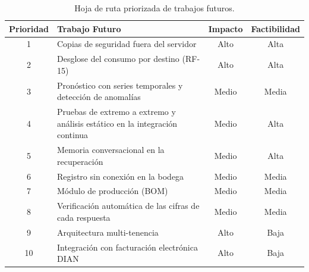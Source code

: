 \begin{table}[!htbp]
\centering
\caption{Hoja de ruta priorizada de trabajos futuros.}
\label{tab:roadmap}
\begin{tabular}{|c|>{\raggedright\arraybackslash}p{6cm}|c|c|}
\hline
\textbf{Prioridad} & \textbf{Trabajo Futuro} & \textbf{Impacto} & \textbf{Factibilidad} \\
\hline
1 & Copias de seguridad fuera del servidor & Alto & Alta \\
2 & Desglose del consumo por destino (RF-15) & Alto & Alta \\
3 & Pronóstico con series temporales y detección de anomalías & Medio & Media \\
4 & Pruebas de extremo a extremo y análisis estático en la integración continua & Medio & Alta \\
5 & Memoria conversacional en la recuperación & Medio & Alta \\
6 & Registro sin conexión en la bodega & Medio & Media \\
7 & Módulo de producción (BOM) & Medio & Media \\
8 & Verificación automática de las cifras de cada respuesta & Medio & Media \\
9 & Arquitectura multi-tenencia & Alto & Baja \\
10 & Integración con facturación electrónica DIAN & Alto & Baja \\
\hline
\end{tabular}
\end{table}
